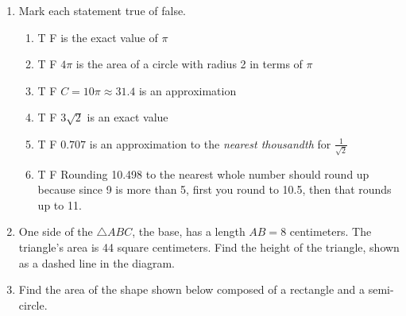 \begin{enumerate}
\item Mark each statement true of false.
\begin{enumerate}[itemsep=0.3cm]
  \item T \quad F  is the exact value of $\pi$
  \item T \quad F \qquad $4\pi$ is the area of a circle with radius 2 in terms of $\pi$
  \item T \quad F \qquad $C = 10\pi \approx 31.4$ is an approximation
  \item T \quad F \qquad $3\sqrt{2}$ is an exact value
  \item T \quad F \qquad $0.707$ is an approximation to the \emph{nearest thousandth} for $\displaystyle \frac{1}{\sqrt{2}}$
  \item T \quad F \qquad Rounding 10.498 to the nearest whole number should round up because since 9 is more than 5, first you round to 10.5, then that rounds up to 11.
\end{enumerate}

\newpage
\item One side of the $\triangle ABC$, the base, has a length $AB=8$ centimeters. The triangle's area is 44 square centimeters. Find the height of the triangle, shown as a dashed line in the diagram. \par
{}

\item Find the area of the shape shown below composed of a rectangle and a semi-circle.
  \begin{flushright}
  \end{flushright} \vspace{1cm}


\end{enumerate}
